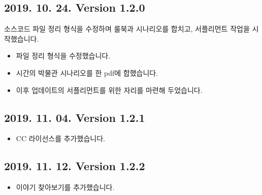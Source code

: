 \documentclass{report}
\begin{document}
	\subsection*{2019. 10. 24. Version 1.2.0}
	소스코드 파일 정리 형식을 수정하며 룰북과 시나리오를 합치고, 서플리먼트 작업을 시작했습니다.
	\begin{itemize}
		\item 파일 정리 형식을 수정했습니다.
		\item 시간의 박물관 시나리오를 한 pdf에 합했습니다.
		\item 이후 업데이트의 서플리먼트를 위한 자리를 마련해 두었습니다.
	\end{itemize}
	
	\subsection*{2019. 11. 04. Version 1.2.1}
	\begin{itemize}
		\item CC 라이선스를 추가했습니다.
	\end{itemize}
	
	\subsection*{2019. 11. 12. Version 1.2.2}
	\begin{itemize}
		\item 이야기 찾아보기를 추가했습니다.
	\end{itemize}
\end{document}
